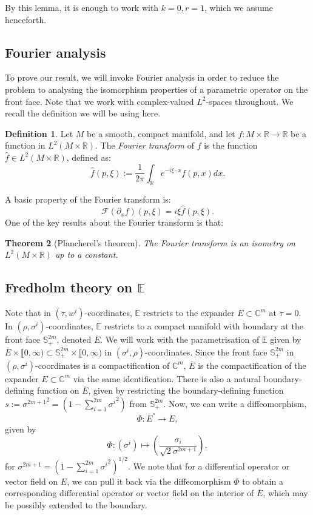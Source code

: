 \documentclass[10pt, a4paper]{article}
\theoremstyle{plain}%
\newtheorem{theorem}{Theorem}[section]
\theoremstyle{definition}
\newtheorem{defn}[theorem]{Definition}
\numberwithin{figure}{section}
\numberwithin{equation}{section}
\newcommand{\bR}{\mathbb{R}}
\newcommand{\bC}{\mathbb{C}}
\newcommand{\bS}{\mathbb{S}}
\newcommand{\bE}{\mathbb{E}}
\newcommand{\pa}{\partial}
\newcommand{\rt}{\rightarrow}
\newcommand{\oE}{{\overline{E}}}
\newcommand{\cF}{\mathcal{F}}
\begin{document}
By this lemma, it is enough to work with $k=0,r=1$, which we assume henceforth.


 \subsection{Fourier analysis}
 
To prove our result, we will invoke Fourier analysis in order to reduce the problem to analysing the isomorphism properties of a parametric operator on the front face. Note that we work with complex-valued $L^2$-spaces throughout.                                                We recall the definition we will be using here.
 
 \begin{defn}
 	Let $M$ be a smooth, compact manifold, and let $f : M\times \bR \rt \bR$ be a function in $L^2(M\times \bR)$. The \textit{Fourier transform} of $f$ is the function $\hat{f} \in L^2(M\times \bR)$, defined as:
 	\[
 	\hat{f}(p,\xi):= \frac{1}{2\pi}\int_{\bR}e^{-i\xi\cdot x}f(p,x)dx.
 	\] 
 \end{defn}
 
A basic property of the Fourier transform is:
 \[
 	\cF(\pa_x f)(p,\xi) = i\xi\hat{f}(p,\xi).
 	\]
One of the key results about the Fourier transform is that:
\begin{theorem}[Plancherel's theorem]
	The Fourier transform is an isometry on $L^2(M\times \bR)$ up to a constant.
\end{theorem}

 \subsection{Fredholm theory on $\bE$}\label{subsec_Fredholmtheory}

Note that in $(\tau,w^i)$-coordinates, $\bE$ restricts to the expander $E \subset \bC^m$ at $\tau=0$. In $(\rho,\sigma^i)$-coordinates, $\bE$ restricts to a compact manifold with boundary at the front face $\bS^{2m}_+$, denoted $\oE$. We will work with the parametrisation of $\bE$ given by $\oE\times\llbracket0,\infty)\subset \bS^{2m}_+ \times \llbracket0,\infty)$ in $(\sigma^i,\rho)$-coordinates. Since the front face $\bS^{2m}_+$ in $(\rho,\sigma^i)$-coordinates is a compactification of $\bC^m$, $\oE$ is the compactification of the expander $E\subset \bC^m$ via the same identification. There is also a natural boundary-defining function on $\oE$, given by restricting the boundary-defining function $s := {\sigma^{2m+1}}^2 =  (1-\sum_{i=1}^{2m} {\sigma^i}^2)$ from $\bS^{2m}_+$. Now, we can write a diffeomorphism, \[
\Phi : \oE^\circ \rt E,
\]  
given by \begin{equation}\label{eq_phi}
\Phi: (\sigma^i) \mapsto \left( \frac{\sigma_i}{\sqrt{2}\sigma^{2m+1}}\right),
\end{equation}
for $\sigma^{2m+1} = ({1-\sum_{i=1}^{2m}{\sigma^i}^2})^{1/2}$.
We note that for a differential operator or vector field on $E$, we can pull it back via the diffeomorphism $\Phi$ to obtain a corresponding differential operator or vector field on the interior of $\overline{E}$, which may be possibly extended to the boundary. 
\end{document}
